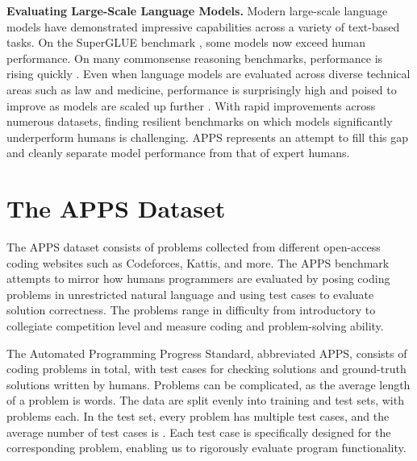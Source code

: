 \documentclass{article}
\begin{document}
\textbf{Evaluating Large-Scale Language Models.}\quad
Modern large-scale language models have demonstrated impressive capabilities across a variety of text-based tasks. On the SuperGLUE benchmark \citep{Wang2019SuperGLUEAS}, some models now exceed human performance. On many commonsense reasoning benchmarks, performance is rising quickly \citep{zellers2019hellaswag,huang2019cosmosqa,bisk2019physicaliqa}. Even when language models are evaluated across diverse technical areas such as law and medicine, performance is surprisingly high and poised to improve as models are scaled up further \citep{hendryckstest2021}. With rapid improvements across numerous datasets, finding resilient benchmarks on which models significantly underperform humans is challenging. APPS represents an attempt to fill this gap and cleanly separate model performance from that of expert humans.











 \section{The APPS Dataset}\label{sec:dataset}

The APPS dataset consists of problems collected from different open-access coding websites such as Codeforces, Kattis, and more. The APPS benchmark attempts to mirror how humans programmers are evaluated by posing coding problems in unrestricted natural language and using test cases to evaluate solution correctness. The problems range in difficulty from introductory to collegiate competition level and measure coding and problem-solving ability. 

The Automated Programming Progress Standard, abbreviated APPS, consists of  coding problems in total, with  test cases for checking solutions and  ground-truth solutions written by humans. Problems can be complicated, as the average length of a problem is  words.
The data are split evenly into training and test sets, with  problems each. In the test set, every problem has multiple test cases, and the average number of test cases is . Each test case is specifically designed for the corresponding problem, enabling us to rigorously evaluate program functionality.

  
\end{document}
